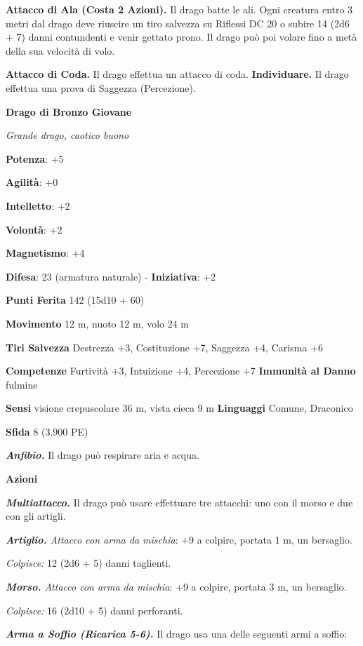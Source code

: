 \begin{multicols}{2}
\textbf{Attacco di Ala (Costa 2 Azioni).} Il drago batte le ali. Ogni
creatura entro 3 metri dal drago deve riuscire un tiro salvezza su Riflessi DC 20 o subire 14 (2d6 + 7) danni contundenti e venir gettato
prono. Il drago può poi volare fino a metà della sua velocità di volo.

\textbf{Attacco di Coda.} Il drago effettua un attacco di coda.
\textbf{Individuare.} Il drago effettua una prova di Saggezza
(Percezione).



\textbf{Drago di Bronzo Giovane}

\emph{Grande drago, caotico buono}

\textbf{Potenza}: +5

\textbf{Agilità}: +0

\textbf{Intelletto}: +2

\textbf{Volontà}: +2

\textbf{Magnetismo}: +4

\textbf{Difesa}: 23 (armatura naturale) - \textbf{Iniziativa}: +2

\textbf{Punti Ferita} 142 (15d10 + 60)

\textbf{Movimento} 12 m, nuoto 12 m, volo 24 m

\textbf{Tiri Salvezza} Destrezza +3, Costituzione +7, Saggezza +4,
Carisma +6

\textbf{Competenze} Furtività +3, Intuizione +4, Percezione +7
\textbf{Immunità al Danno} fulmine

\textbf{Sensi} visione crepuscolare 36 m, vista cieca 9 m
\textbf{Linguaggi} Comune, Draconico

\textbf{Sfida} 8 (3.900 PE)\smallskip

\emph{\textbf{Anfibio.}} Il drago può respirare aria e acqua.

\smallskip\textbf{Azioni}

\emph{\textbf{Multiattacco.}} Il drago può usare effettuare tre
attacchi: uno con il morso e due con gli artigli.

\emph{\textbf{Artiglio.} Attacco con arma da mischia}: +9 a colpire,
portata 1 m, un bersaglio.

\emph{Colpisce:} 12 (2d6 + 5) danni taglienti.

\emph{\textbf{Morso.} Attacco con arma da mischia}: +9 a colpire,
portata 3 m, un bersaglio.

\emph{Colpisce:} 16 (2d10 + 5) danni perforanti.

\emph{\textbf{Arma a Soffio (Ricarica 5-6).}} Il drago usa una delle
seguenti armi a soffio:


\end{multicols}
